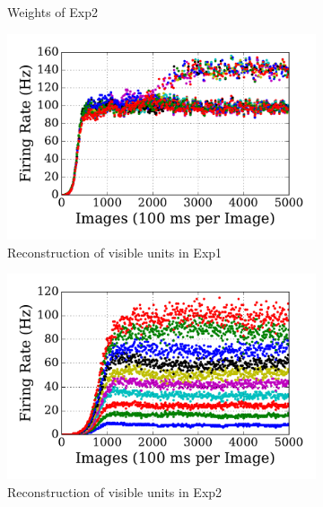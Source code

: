 \begin{figure}
\begin{subfigure}[t]{0.48\textwidth}
		\caption{Weights of Exp2}
	\end{subfigure}
	\begin{subfigure}[t]{0.48\textwidth}
		\includegraphics[width=\textwidth]{pics_sdlm/10_exp_SRBM_Orig/exp1_recon_s.pdf}
		\caption{Reconstruction of visible units in Exp1}
	\end{subfigure}
	\begin{subfigure}[t]{0.48\textwidth}
		\includegraphics[width=\textwidth]{pics_sdlm/10_exp_SRBM_Orig/exp2_recon_s.pdf}
		\caption{Reconstruction of visible units in Exp2}
	\end{subfigure}\\
	\begin{subfigure}[t]{0.48\textwidth}

\end{subfigure}
\end{figure}
